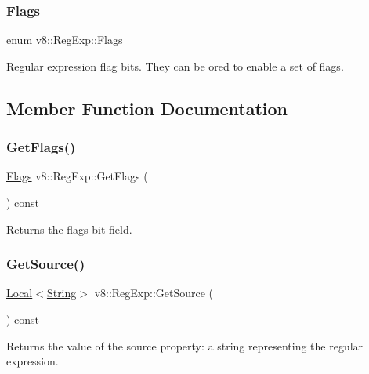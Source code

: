 \subsubsection{\texorpdfstring{Flags}{Flags}}
{\footnotesize\ttfamily enum \mbox{\hyperlink{classv8_1_1RegExp_aa4718a5c1f18472aff3bf51ed694fc5a}{v8\+::\+Reg\+Exp\+::\+Flags}}}

Regular expression flag bits. They can be or\textquotesingle{}ed to enable a set of flags. 

\subsection{Member Function Documentation}
\mbox{\label{classv8_1_1RegExp_aaf00a07b6f8368a1a99bf0bac327af21}} 
\subsubsection{\texorpdfstring{Get\+Flags()}{GetFlags()}}
{\footnotesize\ttfamily \mbox{\hyperlink{classv8_1_1RegExp_aa4718a5c1f18472aff3bf51ed694fc5a}{Flags}} v8\+::\+Reg\+Exp\+::\+Get\+Flags (\begin{DoxyParamCaption}{ }\end{DoxyParamCaption}) const}

Returns the flags bit field. \mbox{\label{classv8_1_1RegExp_ad43d2879796a6991ff19954f4755778a}} 
\subsubsection{\texorpdfstring{Get\+Source()}{GetSource()}}
{\footnotesize\ttfamily \mbox{\hyperlink{classv8_1_1Local}{Local}}$<$\mbox{\hyperlink{classv8_1_1String}{String}}$>$ v8\+::\+Reg\+Exp\+::\+Get\+Source (\begin{DoxyParamCaption}{ }\end{DoxyParamCaption}) const}

Returns the value of the source property\+: a string representing the regular expression. \mbox{\label{classv8_1_1RegExp_a0ddd75d67bc7e6efbd6486f764ddd458}} 
